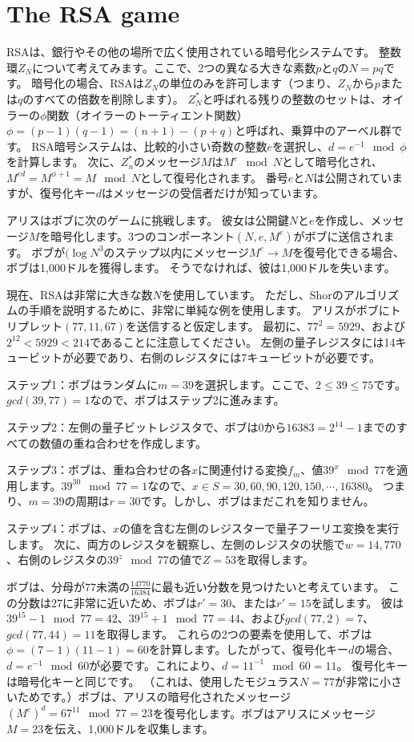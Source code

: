 \section{The RSA game}

RSAは、銀行やその他の場所で広く使用されている暗号化システムです。
整数環$Z_N$について考えてみます。ここで、2つの異なる大きな素数$p$と$q$の$N = pq$です。
暗号化の場合、RSAは$Z_N$の単位のみを許可します（つまり、$Z_N$から$p$または$q$のすべての倍数を削除します）。
$Z_N^*$と呼ばれる残りの整数のセットは、オイラーの$\phi $関数（オイラーのトーティエント関数）$\phi = (p-1)(q-1)=(n + 1)-(p + q)$と呼ばれ、乗算中のアーベル群です。
RSA暗号システムは、比較的小さい奇数の整数$e$を選択し、$d = e^{-1} \mod \phi$を計算します。
次に、$Z_n^*$のメッセージ$M$は$M^e \mod N$として暗号化され、$M^{ed} = M^{\phi + 1} = M \mod N$として復号化されます。
番号$e$と$N$は公開されていますが、復号化キー$d$はメッセージの受信者だけが知っています。

アリスはボブに次のゲームに挑戦します。 彼女は公開鍵$N$と$e$を作成し、メッセージ$M$を暗号化します。3つのコンポーネント$(N,e,M^e)$がボブに送信されます。 ボブが$( \log N^3$のステップ以内にメッセージ$M^e \to M$を復号化できる場合、ボブは1,000ドルを獲得します。 そうでなければ、彼は1,000ドルを失います。

現在、RSAは非常に大きな数$N$を使用しています。
ただし、Shorのアルゴリズムの手順を説明するために、非常に単純な例を使用します。
アリスがボブにトリプレット$(77,11,67)$を送信すると仮定します。
最初に、$77^2 = 5929$、および$2^{12} < 5929 < 214$であることに注意してください。
左側の量子レジスタには14キュービットが必要であり、右側のレジスタには7キュービットが必要です。

ステップ1：ボブはランダムに$m = 39$を選択します。ここで、$2 \le 39 \le 75$です。$gcd(39,77)= 1$なので、ボブはステップ2に進みます。

ステップ2：左側の量子ビットレジスタで、ボブは$0$から$16383 = 2^{14} −1$までのすべての数値の重ね合わせを作成します。

ステップ3：ボブは、重ね合わせの各$x$に関連付ける変換$f_m$、値$39^x \mod 77$を適用します。$39^{30} \mod 77= 1$なので、$x \in S = {30,60,90,120,150, \cdots ,16380}$。 つまり、$m = 39$の周期は$r = 30$です。しかし、ボブはまだこれを知りません。

ステップ4：ボブは、$x$の値を含む左側のレジスターで量子フーリエ変換を実行します。 次に、両方のレジスタを観察し、左側のレジスタの状態で$w = 14,770$、右側のレジスタの$39^z \mod 77$の値で$Z = 53$を取得します。

ボブは、分母が$77$未満の$\frac{14770}{16384}$に最も近い分数を見つけたいと考えています。
この分数は27に非常に近いため、ボブは$r'= 30$、または$r' = 15$を試します。 彼は$39^{15}-1 \mod 77 = 42$、$39^{15} + 1 \mod 77 = 44$、および$gcd(77,2) = 7$、$gcd(77,44) = 11$を取得します。
これらの2つの要素を使用して、ボブは$\phi =(7 − 1)(11 − 1)= 60$を計算します。したがって、復号化キー$d$の場合、$d = e^{−1} \mod 60$が必要です。これにより、$d = 11^{−1} \mod 60 = 11$。
復号化キーは暗号化キーと同じです。 （これは、使用したモジュラス$N = 77$が非常に小さいためです。）ボブは、アリスの暗号化されたメッセージ$(M^e)^d = 67^{11} \mod 77 = 23$を復号化します。ボブはアリスにメッセージ$M = 23$を伝え、1,000ドルを収集します。
